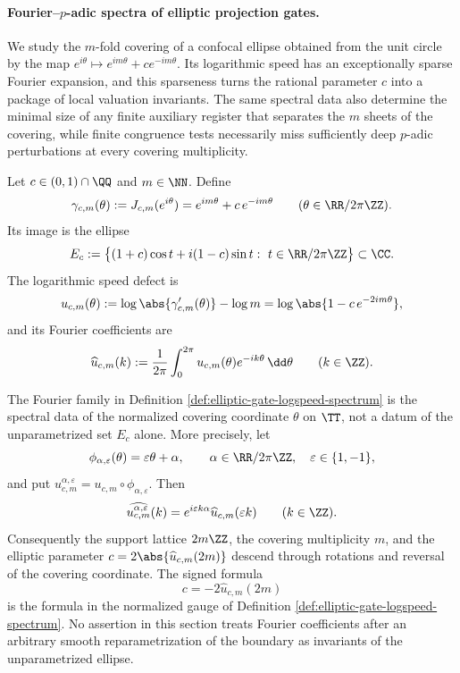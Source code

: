 \paragraph{Fourier--\(p\)-adic spectra of elliptic projection gates.}
We study the \(m\)-fold covering of a confocal ellipse obtained from the unit circle by the map \(e^{i\theta}\mapsto e^{im\theta}+c e^{-im\theta}\). Its logarithmic speed has an exceptionally sparse Fourier expansion, and this sparseness turns the rational parameter \(c\) into a package of local valuation invariants. The same spectral data also determine the minimal size of any finite auxiliary register that separates the \(m\) sheets of the covering, while finite congruence tests necessarily miss sufficiently deep \(p\)-adic perturbations at every covering multiplicity.

\begin{definition}\label{def:elliptic-gate-logspeed-spectrum}
Let \(c\in(0,1)\cap\QQ\) and \(m\in\NN\). Define
\[
\gamma_{c,m}(\theta):=J_{c,m}(e^{i\theta})=e^{im\theta}+c\,e^{-im\theta}
\qquad (\theta\in\RR/2\pi\ZZ).
\]
Its image is the ellipse
\[
E_c:=\bigl\{(1+c)\cos t+i(1-c)\sin t:\ t\in\RR/2\pi\ZZ\bigr\}\subset\CC.
\]
The logarithmic speed defect is
\[
u_{c,m}(\theta):=\log\abs{\gamma_{c,m}'(\theta)}-\log m
=\log\abs{1-c\,e^{-2im\theta}},
\]
and its Fourier coefficients are
\[
\widehat u_{c,m}(k):=\frac{1}{2\pi}\int_{0}^{2\pi}u_{c,m}(\theta)e^{-ik\theta}\,\dd\theta
\qquad (k\in\ZZ).
\]
\end{definition}

\begin{lemma}\label{lem:elliptic-gate-parametrized-gauge}
The Fourier family in Definition \ref{def:elliptic-gate-logspeed-spectrum} is the spectral data of the normalized covering coordinate \(\theta\) on \(\TT\), not a datum of the unparametrized set \(E_c\) alone.  More precisely, let
\[
\phi_{\alpha,\varepsilon}(\theta)=\varepsilon\theta+\alpha,
\qquad
\alpha\in\RR/2\pi\ZZ,
\quad \varepsilon\in\{1,-1\},
\]
and put \(u^{\alpha,\varepsilon}_{c,m}=u_{c,m}\circ\phi_{\alpha,\varepsilon}\).  Then
\[
\widehat{u^{\alpha,\varepsilon}_{c,m}}(k)
=e^{i\varepsilon k\alpha}\widehat u_{c,m}(\varepsilon k)
\qquad (k\in\ZZ).
\]
Consequently the support lattice \(2m\ZZ\), the covering multiplicity \(m\), and the elliptic parameter \(c=2\abs{\widehat u_{c,m}(2m)}\) descend through rotations and reversal of the covering coordinate.  The signed formula
\[
c=-2\widehat u_{c,m}(2m)
\]
is the formula in the normalized gauge of Definition \ref{def:elliptic-gate-logspeed-spectrum}.  No assertion in this section treats Fourier coefficients after an arbitrary smooth reparametrization of the boundary as invariants of the unparametrized ellipse.
\end{lemma}

